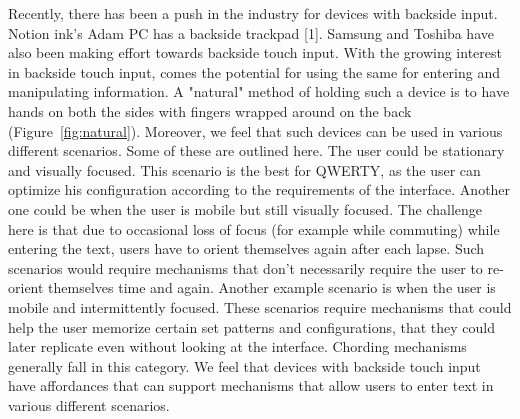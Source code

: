 Recently, there has been a push in the industry for devices with
backside input. Notion ink's Adam PC has a backside trackpad
[1]. Samsung and Toshiba have also been making effort towards
backside touch input. With the growing interest in backside touch
input, comes the potential for using the same for entering and
manipulating information. A "natural" method of holding such a device
is to have hands on both the sides with fingers wrapped around on the
back (Figure~\ref{fig:natural}). Moreover, we feel that such devices can be used in various different scenarios. Some of these are outlined here. The user could be stationary and visually focused. This scenario is the best for QWERTY, as the user can optimize his configuration according to the requirements of the interface. Another one could be when the user is mobile but still visually focused. The challenge here is
that due to occasional loss of focus (for example while commuting) while entering the text, users
have to orient themselves again after each lapse. Such scenarios would
require mechanisms that don't necessarily require the user to
re-orient themselves time and again. Another example scenario is when the user is mobile and intermittently focused. These scenarios require mechanisms that could help the user memorize certain set patterns and configurations, that they could later replicate even without looking at the interface. Chording mechanisms generally fall in this category. We feel that devices with backside touch input have affordances that can support mechanisms that allow users to enter text in various different scenarios.

